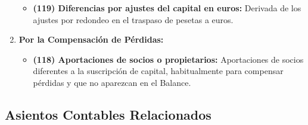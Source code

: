 \documentclass[
  paper=a4,
  ,captions=tableheading
]{scrbook}
\providecommand{\tightlist}{%
  \setlength{\itemsep}{0pt}\setlength{\parskip}{0pt}}
\begin{document}
\begin{enumerate}
  \begin{itemize}
  \tightlist
  \item
    \textbf{(119) Diferencias por ajustes del capital en euros:}
    Derivada de los ajustes por redondeo en el traspaso de pesetas a
    euros.
  \end{itemize}
\item
  \textbf{Por la Compensación de Pérdidas:}

  \begin{itemize}
  \tightlist
  \item
    \textbf{(118) Aportaciones de socios o propietarios:} Aportaciones
    de socios diferentes a la suscripción de capital, habitualmente para
    compensar pérdidas y que no aparezcan en el Balance.
  \end{itemize}
\end{enumerate}

\hypertarget{asientos-contables-relacionados}{%
\subsection{Asientos Contables
Relacionados}\label{asientos-contables-relacionados}}
\end{document}
